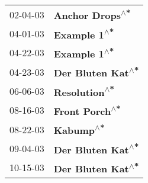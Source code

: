 \begin{supertabular}{p{0.25\columnwidth}p{0.75\columnwidth}}
 02-04-03 &    \textbf{Anchor Drops\textsuperscript{$\wedge$*}} \\
 04-01-03 &       \textbf{Example 1\textsuperscript{$\wedge$*}} \\
 04-22-03 &       \textbf{Example 1\textsuperscript{$\wedge$*}} \\
 04-23-03 &  \textbf{Der Bluten Kat\textsuperscript{$\wedge$*}} \\
 06-06-03 &      \textbf{Resolution\textsuperscript{$\wedge$*}} \\
 08-16-03 &     \textbf{Front Porch\textsuperscript{$\wedge$*}} \\
 08-22-03 &          \textbf{Kabump\textsuperscript{$\wedge$*}} \\
 09-04-03 &  \textbf{Der Bluten Kat\textsuperscript{$\wedge$*}} \\
 10-15-03 &  \textbf{Der Bluten Kat\textsuperscript{$\wedge$*}} \\
\end{supertabular}
